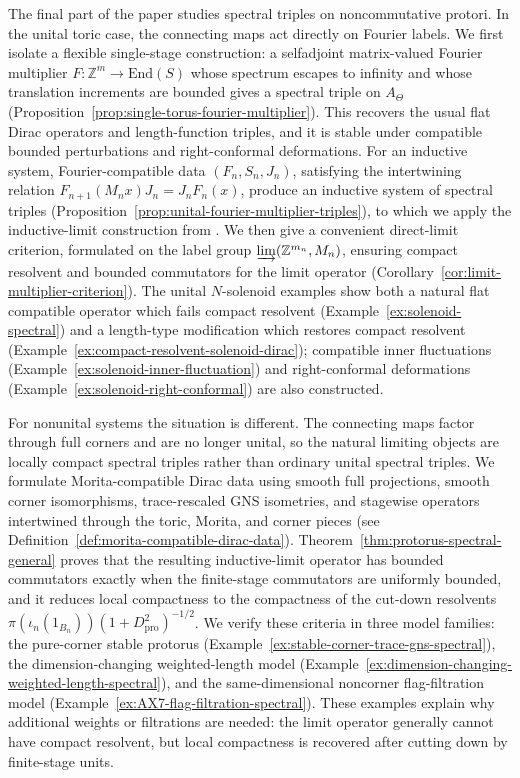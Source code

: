 \documentclass[11pt]{amsart}
\theoremstyle{definition}
\theoremstyle{remark}
\newcommand{\ex}{\mathrm{pro}}
\newcommand{\End}{\mathrm{End}}
\begin{document}
The final part of the paper studies spectral triples on noncommutative protori.
In the unital toric case, the connecting maps act directly on Fourier labels.
We first isolate a flexible single-stage construction: a selfadjoint
matrix-valued Fourier multiplier
$F\colon \mathbb Z^m\to \End(S)$ whose spectrum escapes to infinity and whose
translation increments are bounded gives a spectral triple on $A_\Theta$
(Proposition~\ref{prop:single-torus-fourier-multiplier}).  This recovers the
usual flat Dirac operators and length-function triples, and it is stable under
compatible bounded perturbations and right-conformal deformations.  For an
inductive system, Fourier-compatible data $(F_n,S_n,J_n)$, satisfying the
intertwining relation $F_{n+1}(M_nx)J_n=J_nF_n(x)$, produce an inductive system of spectral triples
(Proposition~\ref{prop:unital-fourier-multiplier-triples}), to which we apply
the inductive-limit construction from \cite{FloricelGhorbanpour}.  We then give
a convenient direct-limit criterion, formulated on the label group
$\varinjlim(\mathbb Z^{m_n},M_n)$, ensuring compact resolvent and bounded
commutators for the limit operator (Corollary~\ref{cor:limit-multiplier-criterion}).
The unital $N$-solenoid examples show both a natural flat compatible operator
which fails compact resolvent (Example~\ref{ex:solenoid-spectral}) and a length-type modification which restores
compact resolvent (Example~\ref{ex:compact-resolvent-solenoid-dirac}); compatible inner fluctuations (Example~\ref{ex:solenoid-inner-fluctuation}) and right-conformal
deformations (Example~\ref{ex:solenoid-right-conformal}) are also constructed.

For nonunital systems the situation is different.  The connecting maps factor
through full corners and are no longer unital, so the natural limiting objects
are locally compact spectral triples rather than ordinary unital spectral
triples.  We formulate Morita-compatible Dirac data using smooth full
projections, smooth corner isomorphisms, trace-rescaled GNS isometries, and
stagewise operators intertwined through the toric, Morita, and corner pieces (see Definition~\ref{def:morita-compatible-dirac-data}).
Theorem~\ref{thm:protorus-spectral-general} proves that the resulting
inductive-limit operator has bounded commutators exactly when the finite-stage
commutators are uniformly bounded, and it reduces local compactness to the
compactness of the cut-down resolvents $\pi(\iota_n(1_{B_n}))(1+D_{\ex}^2)^{-1/2}$.  We verify these criteria in
three model families: the pure-corner stable protorus (Example~\ref{ex:stable-corner-trace-gns-spectral}), the dimension-changing
weighted-length model (Example~\ref{ex:dimension-changing-weighted-length-spectral}), and the same-dimensional noncorner flag-filtration
model (Example~\ref{ex:AX7-flag-filtration-spectral}).  These examples explain why additional weights or filtrations are needed:
the limit operator generally cannot have compact resolvent, but local
compactness is recovered after cutting down by finite-stage units.
\end{document}
